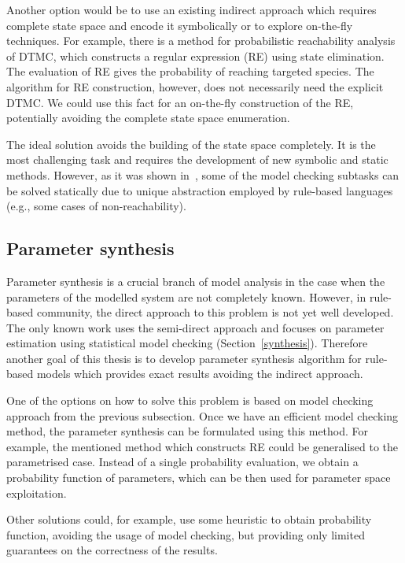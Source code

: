 \documentclass[11pt,a4paper]{report}
\begin{document}
Another option would be to use an existing indirect approach which requires complete state space and encode it symbolically or to explore on-the-fly techniques. For example, there is a method for probabilistic reachability analysis of DTMC, which constructs a regular expression (RE) using state elimination. The evaluation of RE gives the probability of reaching targeted species. The algorithm for RE construction, however, does not necessarily need the explicit DTMC. We could use this fact for an on-the-fly construction of the RE, potentially avoiding the complete state space enumeration.

The ideal solution avoids the building of the state space completely. It is the most challenging task and requires the development of new symbolic and static methods. However, as it was shown in~\cite{trojak2018sasb}, some of the model checking subtasks can be solved statically due to unique abstraction employed by rule-based languages (e.g., some cases of non-reachability).

\subsection{Parameter synthesis}

Parameter synthesis is a crucial branch of model analysis in the case when the parameters of the modelled system are not completely known. However, in rule-based community, the direct approach to this problem is not yet well developed. The only known work uses the semi-direct approach and focuses on parameter estimation using statistical model checking (Section~\ref{synthesis}). Therefore another goal of this thesis is to develop parameter synthesis algorithm for rule-based models which provides exact results avoiding the indirect approach.

One of the options on how to solve this problem is based on model checking approach from the previous subsection. Once we have an efficient model checking method, the parameter synthesis can be formulated using this method. For example, the mentioned method which constructs RE could be generalised to the parametrised case. Instead of a single probability evaluation, we obtain a probability function of parameters, which can be then used for parameter space exploitation. 

Other solutions could, for example, use some heuristic to obtain probability function, avoiding the usage of model checking, but providing only limited guarantees on the correctness of the results.
\end{document}
